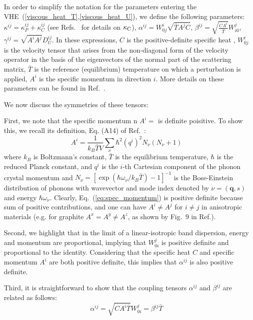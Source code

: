 \documentclass[
prb,
twocolumn,
superscriptaddress,
 amsmath,amssymb,
 aps,
longbibliography,
]{revtex4-2}
\begin{document}
In order to simplify the notation for the parameters entering the VHE~(\ref{viscous_heat_T},\ref{viscous_heat_U}), we define the following parameters: $\kappa^{ij} = \kappa^{ij}_{P} + \kappa^{ij}_{C}$ (see Refs.~\cite{simoncelli2019unified,simoncelli2021Wigner,caldarelli_many-body_2022,di_lucente_crossover_2023} for details on $\kappa_{\rm C}$), $\alpha^{ij}{=}W_{0j}^i\sqrt{\overline T A^jC}$, $\beta^{ij}{=}\sqrt{\frac{CA^i}{\overline T}} W_{i0}^j$, $\gamma^{ij}{=}\sqrt{A^i A^j} D_U^{ij}$.
In these expressions, $C$ is the positive-definite specific heat \cite{Simoncelli2020},
${W}_{0 j}^i$ is the velocity tensor that arises from the non-diagonal form of the velocity operator in the basis of the eigenvectors of the normal part of the scattering matrix,
$\bar{T}$ is the reference (equilibrium) temperature on which a perturbation is applied,
$A^i$ is the specific momentum in direction $i$. More details on these parameters can be found in Ref.~\cite{Simoncelli2020}.

We now discuss the symmetries of these tensors:

First, we note that the specific momentum n $A^i=$ is definite poisitive. To show this, we recall its definition, Eq. (A14) of Ref.~\cite{Simoncelli2020}:
\begin{equation}
	A^i=\frac{1}{k_B\bar T V}\sum_\nu \hbar^2 (q^i)^2 N_\nu(N_\nu+1)
	\label{eq:spec_momentum}
\end{equation}
where $k_B$ is Boltzmann's constant, $\bar T$ is the equilibrium temperature, $\hbar$ is the reduced Planck constant, and $q^i$ is the $i$-th Cartesian component of the phonon crystal momentum and $N_\nu=[\exp(\hbar\omega_\nu/k_B \bar T)-1]^{-1}$ is the Bose-Einstein distribution of phonons with wavevector and mode index denoted by $\nu=(\bm{q},s)$ and energy $\hbar\omega_\nu$.
Clearly,  Eq.~(\ref{eq:spec_momentum}) is positive definite because sum of positive contributions, and one can have $A^i\neq A^j$ for $i\neq j$ in anisotropic materials (e.g. for graphite $A^x=A^y\neq A^z$, as shown by Fig.~9 in Ref.\cite{Simoncelli2020}).

Second, we highlight that in the limit of a linear-isotropic band dispersion, energy and momentum are proportional, implying that $W_{0i}^j$ is positive definite and proportional to the identity.
Considering that the specific heat $C$ and specific momentum $A^i$ are both positive definite, this implies that $\alpha^{ij}$ is also positive definite.

Third, it is straightforward to show that the coupling tensors $\alpha^{ij}$ and $\beta^{ij}$ are related as follows:
\begin{equation}
\alpha^{ij}{=}\sqrt{C A^i \overline T }W_{0i}^j=\beta^{ij}\bar T
\end{equation}
\end{document}
